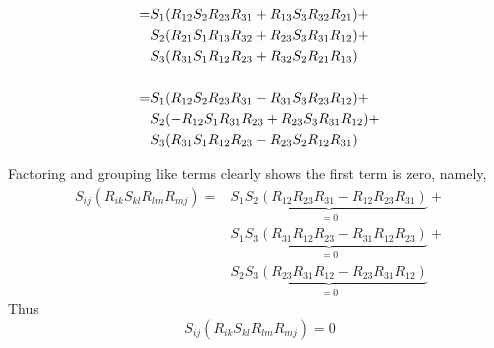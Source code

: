 \begin{subequations}
    \begin{align}
        = &
                S_{1} ( R_{12}S_{2}R_{23}R_{31}       + R_{13} S_{3} R_{32} R_{21}) +           \notag  \\
            &   S_{2} ( R_{21} S_{1} R_{13} R_{32}    + R_{23} S_{3} R_{31} R_{12}) +                   \\
            &   S_{3} ( R_{31} S_{1} R_{12} R_{23}    + R_{32} S_{2} R_{21} R_{13})             \notag  \\
            \notag \\
            = &  
                S_{1} ( R_{12}S_{2}R_{23}R_{31}       - R_{31} S_{3} R_{23} R_{12}) +           \notag  \\
            &   S_{2} ( -R_{12} S_{1} R_{31} R_{23}   + R_{23} S_{3} R_{31} R_{12}) +                   \\
            &   S_{3} ( R_{31} S_{1} R_{12} R_{23}    - R_{23} S_{2} R_{12} R_{31})             \notag
    \end{align}
\end{subequations}

Factoring and grouping like terms clearly shows the first term is zero, namely,
\begin{equation}
    \begin{split}
        S_{ij}(R_{ik}S_{kl} R_{lm} R_{mj}) = &
            \underbrace{S_{1}S_{2}(R_{12}R_{23}R_{31} - R_{12}R_{23}R_{31})}_{=0} +   \\
        &   \underbrace{S_{1}S_{3}(R_{31}R_{12}R_{23} - R_{31}R_{12}R_{23})}_{=0} +   \\
        &   \underbrace{S_{2}S_{3}(R_{23}R_{31}R_{12} - R_{23}R_{31}R_{12})}_{=0}
    \end{split}
\end{equation}
Thus
\begin{equation}
    S_{ij}(R_{ik}S_{kl} R_{lm} R_{mj}) = 0
\end{equation}
